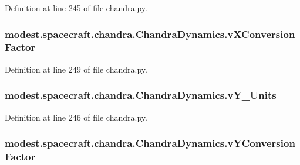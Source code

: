 Definition at line 245 of file chandra.\+py.

\subsubsection[{\texorpdfstring{v\+X\+Conversion\+Factor}{vXConversionFactor}}]{\setlength{\rightskip}{0pt plus 5cm}modest.\+spacecraft.\+chandra.\+Chandra\+Dynamics.\+v\+X\+Conversion\+Factor}\hypertarget{classmodest_1_1spacecraft_1_1chandra_1_1ChandraDynamics_a91c2693c871a0ff13b4c9f56a440517b}{}\label{classmodest_1_1spacecraft_1_1chandra_1_1ChandraDynamics_a91c2693c871a0ff13b4c9f56a440517b}


Definition at line 249 of file chandra.\+py.

\subsubsection[{\texorpdfstring{v\+Y\+\_\+\+Units}{vY_Units}}]{\setlength{\rightskip}{0pt plus 5cm}modest.\+spacecraft.\+chandra.\+Chandra\+Dynamics.\+v\+Y\+\_\+\+Units}\hypertarget{classmodest_1_1spacecraft_1_1chandra_1_1ChandraDynamics_ae62ac2fe9602e1da420f2175d4dc4646}{}\label{classmodest_1_1spacecraft_1_1chandra_1_1ChandraDynamics_ae62ac2fe9602e1da420f2175d4dc4646}


Definition at line 246 of file chandra.\+py.

\subsubsection[{\texorpdfstring{v\+Y\+Conversion\+Factor}{vYConversionFactor}}]{\setlength{\rightskip}{0pt plus 5cm}modest.\+spacecraft.\+chandra.\+Chandra\+Dynamics.\+v\+Y\+Conversion\+Factor}\hypertarget{classmodest_1_1spacecraft_1_1chandra_1_1ChandraDynamics_a06c1ae73f34994203fcfb2a485248d92}{}\label{classmodest_1_1spacecraft_1_1chandra_1_1ChandraDynamics_a06c1ae73f34994203fcfb2a485248d92}


